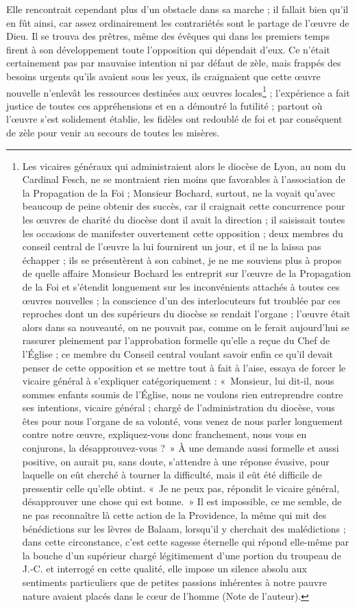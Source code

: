 \documentclass[11pt,a4paper]{report}
\begin{document}
Elle rencontrait cependant plus d'un obstacle dans sa marche ; il fallait bien qu'il en fût ainsi, car assez ordinairement les contrariétés sont le partage de l'œuvre de Dieu. Il se trouva des prêtres, même des évêques qui dans les premiers temps firent à son développement toute l'opposition qui dépendait d'eux. Ce n'était certainement pas par mauvaise intention ni par défaut de zèle, mais frappés des besoins urgents qu'ils avaient sous les yeux, ils craignaient que cette œuvre nouvelle n'enlevât les ressources destinées aux œuvres locales\footnote{Les vicaires généraux qui administraient alors le diocèse de Lyon, au nom du Cardinal Fesch, ne se montraient rien moins que favorables à l'association de la Propagation de la Foi ; Monsieur Bochard, surtout, ne la voyait qu'avec beaucoup de peine obtenir des succès, car il craignait cette concurrence pour les œuvres de charité du diocèse dont il avait la direction ; il saisissait toutes les occasions de manifester ouvertement cette opposition ; deux membres du conseil central de l'œuvre la lui fournirent un jour, et il ne la laissa pas échapper ; ils se présentèrent à son cabinet, je ne me souviens plus à propos de quelle affaire Monsieur Bochard les entreprit sur l'œuvre de la Propagation de la Foi et s'étendit longuement sur les inconvénients attachés à toutes ces œuvres nouvelles ; la conscience d'un des interlocuteurs fut troublée par ces reproches dont un des supérieurs du diocèse se rendait l'organe ; l'œuvre était alors dans sa nouveauté, on ne pouvait pas, comme on le ferait aujourd'hui se rassurer pleinement par l'approbation formelle qu'elle a reçue du Chef de l'Église ; ce membre du Conseil central voulant savoir enfin ce qu'il devait penser de cette opposition et se mettre tout à fait à l'aise, essaya de forcer le vicaire général à s'expliquer catégoriquement : «~Monsieur, lui dit-il, nous sommes enfants soumis de l'Église, nous ne voulons rien entreprendre contre ses intentions, vicaire général ; chargé de l'administration du diocèse, vous êtes pour nous l'organe de sa volonté, vous venez de nous parler longuement contre notre œuvre, expliquez-vous donc franchement, nous vous en conjurons, la désapprouvez-vous ?~» À une demande aussi formelle et aussi positive, on aurait pu, sans doute, s'attendre à une réponse évasive, pour laquelle on eût cherché à tourner la difficulté, mais il eût été difficile de pressentir celle qu'elle obtint. «~Je ne peux pas, répondit le vicaire général, désapprouver une chose qui est bonne.~» Il est impossible, ce me semble, de ne pas reconnaître là cette action de la Providence, la même qui mit des bénédictions sur les lèvres de Balaam, lorsqu'il y cherchait des malédictions ; dans cette circonstance, c'est cette sagesse éternelle qui répond elle-même par la bouche d'un supérieur chargé légitimement d'une portion du troupeau de J.-C. et interrogé en cette qualité, elle impose un silence absolu aux sentiments particuliers que de petites passions inhérentes à notre pauvre nature avaient placés dans le cœur de l'homme (Note de l'auteur).} ; l'expérience a fait justice de toutes ces appréhensions et en a démontré la futilité ; partout où l'œuvre s'est solidement établie, les fidèles ont redoublé de foi et par conséquent de zèle pour venir au secours de toutes les misères.
\end{document}
